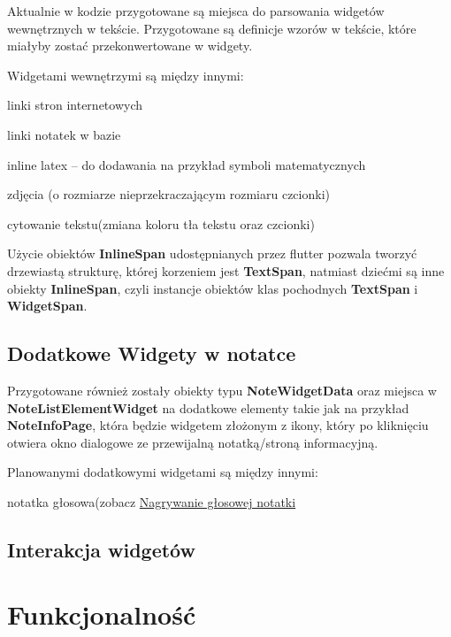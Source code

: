 Aktualnie w kodzie przygotowane są miejsca do parsowania widgetów wewnętrznych w tekście. Przygotowane są definicje wzorów w tekście, które miałyby zostać przekonwertowane w widgety.

Widgetami wewnętrzymi są między innymi:

\begin{compactitem}
    \item linki stron internetowych
    \item linki notatek w bazie
    \item inline latex -- do dodawania na przykład symboli matematycznych
    \item zdjęcia (o rozmiarze nieprzekraczającym rozmiaru czcionki)
    \item cytowanie tekstu(zmiana koloru tła tekstu oraz czcionki)
\end{compactitem}

Użycie obiektów \textbf{InlineSpan} udostępnianych przez flutter pozwala tworzyć drzewiastą strukturę, której korzeniem jest \textbf{TextSpan}, natmiast dziećmi są inne obiekty \textbf{InlineSpan}, czyli instancje obiektów klas pochodnych \textbf{TextSpan} i \textbf{WidgetSpan}.

\subsection{Dodatkowe Widgety w notatce}

Przygotowane również zostały obiekty typu \textbf{NoteWidgetData} oraz miejsca w \textbf{NoteListElementWidget} na dodatkowe elementy takie jak na przykład \textbf{NoteInfoPage}, która będzie widgetem złożonym z ikony, który po kliknięciu otwiera okno dialogowe ze przewijalną notatką/stroną informacyjną.

Planowanymi dodatkowymi widgetami są między innymi:

\begin{compactitem}
    \item notatka głosowa(zobacz \hyperlink{sec:glosowaNotatka}{Nagrywanie głosowej notatki}
    \item 
\end{compactitem}

\subsection{Interakcja widgetów}

\section{Funkcjonalność}

